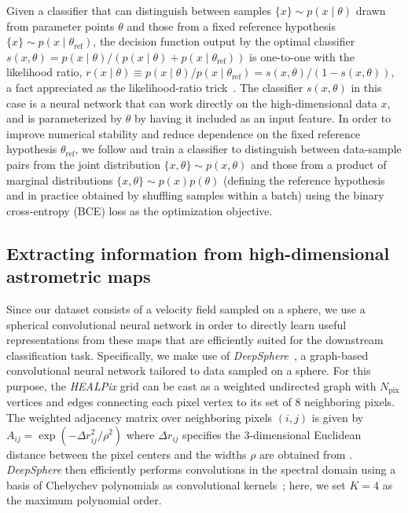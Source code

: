 \documentclass[twocolumn,linenumbers]{aastex631}
\newcommand{\package}[1]{\textsl{#1}\xspace}
\newcommand{\healpix}{\package{HEALPix}}
\newcommand{\deepsphere}{\package{DeepSphere}}
\begin{document}
Given a classifier that can distinguish between samples $\{x\} \sim p(x\mid\theta)$ drawn from parameter points $\theta$ and those from a fixed reference hypothesis $\{x\} \sim p(x\mid\theta_\mathrm{ref})$, the decision function output by the optimal classifier $s(x, \theta) = {p(x\mid\theta)}/{\left(p(x\mid\theta) + p(x\mid\theta_\mathrm{ref})\right)}$ is one-to-one with the likelihood ratio, $r(x\mid \theta) \equiv {p(x\mid\theta)}/{p(x\mid\theta_\mathrm{ref})}  = {s(x, \theta)}/{\left(1 - s(x, \theta)\right)}$, a fact appreciated as the likelihood-ratio trick~\citep{Cranmer:2015bka,mohamed2017learning}. 
The classifier $s(x, \theta)$ in this case is a neural network that can work directly on the high-dimensional data $x$, and is parameterized by $\theta$ by having it included as an input feature. In order to improve numerical stability and reduce dependence on the fixed reference hypothesis $\theta_\mathrm{ref}$, we follow \citet{Hermans:2019ioj} and train a classifier to distinguish between data-sample pairs from the joint distribution $\{x, \theta\} \sim p(x,\theta)$ and those from a product of marginal distributions $\{x, \theta\} \sim p(x)p(\theta)$ (defining the reference hypothesis and in practice obtained by shuffling samples within a batch) using the binary cross-entropy (BCE) loss as the optimization objective. 

\subsection{Extracting information from high-dimensional astrometric maps} 

Since our dataset consists of a velocity field sampled on a sphere, we use a spherical convolutional neural network in order to directly learn useful representations from these maps that are efficiently suited for the downstream classification task. Specifically, we make use of \deepsphere~\citep{2020arXiv201215000D,deepsphere_cosmo}, a graph-based convolutional neural network tailored to data sampled on a sphere. For this purpose, the \healpix grid can be cast as a weighted undirected graph with $N_\mathrm{pix}$ vertices and edges connecting each pixel vertex to its set of 8 neighboring pixels. The weighted adjacency matrix over neighboring pixels $(i, j)$ is given by $A_{ij} = \exp \left(-{\Delta r_{ij}^{2}}/{\rho^{2}}\right)$ where $\Delta r_{ij}$ specifies the 3-dimensional Euclidean distance between the pixel centers and the widths $\rho$ are obtained from \citet{2020arXiv201215000D}. \deepsphere then efficiently performs convolutions in the spectral domain using a basis of Chebychev polynomials as convolutional kernels~\citep{2016arXiv160609375D}; here, we set $K=4$ as the maximum polynomial order. 
\end{document}
